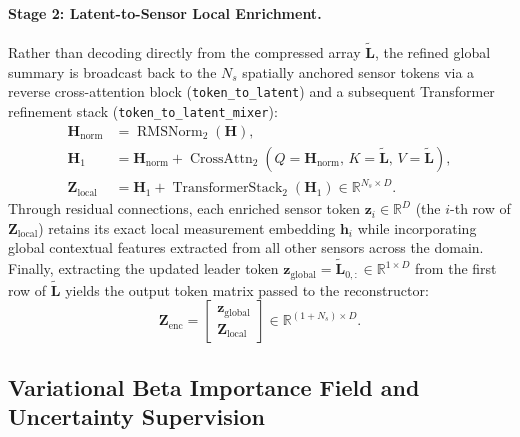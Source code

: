 \paragraph{Stage 2: Latent-to-Sensor Local Enrichment.}
Rather than decoding directly from the compressed array $\tilde{\mathbf{L}}$, the refined global summary is broadcast back to the $N_s$ spatially anchored sensor tokens via a reverse cross-attention block (\texttt{token\_to\_latent}) and a subsequent Transformer refinement stack (\texttt{token\_to\_latent\_mixer}):
\begin{align}
    \mathbf{H}_{\text{norm}} &= \operatorname{RMSNorm}_2(\mathbf{H}), \label{eq:bg_glu_enc_step2a} \\
    \mathbf{H}_1 &= \mathbf{H}_{\text{norm}} + \operatorname{CrossAttn}_2\!\left(Q = \mathbf{H}_{\text{norm}},\, K = \tilde{\mathbf{L}},\, V = \tilde{\mathbf{L}}\right), \label{eq:bg_glu_enc_step2b} \\
    \mathbf{Z}_{\text{local}} &= \mathbf{H}_1 + \operatorname{TransformerStack}_2(\mathbf{H}_1) \in \mathbb{R}^{N_s \times D}. \label{eq:bg_glu_enc_step2c}
\end{align}
Through residual connections, each enriched sensor token $\mathbf{z}_i \in \mathbb{R}^D$ (the $i$-th row of $\mathbf{Z}_{\text{local}}$) retains its exact local measurement embedding $\mathbf{h}_i$ while incorporating global contextual features extracted from all other sensors across the domain. Finally, extracting the updated leader token $\mathbf{z}_{\text{global}} = \tilde{\mathbf{L}}_{0,:} \in \mathbb{R}^{1 \times D}$ from the first row of $\tilde{\mathbf{L}}$ yields the output token matrix passed to the reconstructor:
\begin{equation}
    \mathbf{Z}_{\text{enc}} = \begin{bmatrix} \mathbf{z}_{\text{global}} \\ \mathbf{Z}_{\text{local}} \end{bmatrix} \in \mathbb{R}^{(1 + N_s) \times D}.
    \label{eq:bg_glu_zenc}
\end{equation}

\subsection{Variational Beta Importance Field and Uncertainty Supervision}
\label{subsec:bg_glu_importance}

